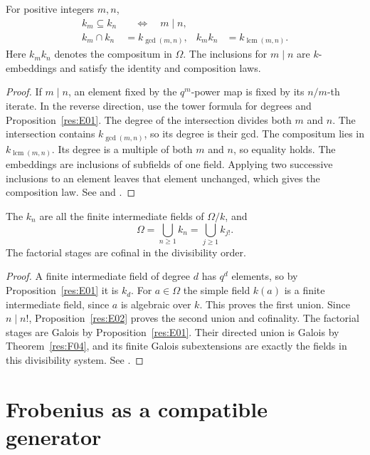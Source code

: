 \begin{proposition}\label{res:E02}
For positive integers \(m,n\),
\[
\begin{aligned}
   k_m\subseteq k_n &\quad\Longleftrightarrow\quad m\mid n,\\
   k_m\cap k_n &= k_{\gcd(m,n)},&
   k_m k_n &= k_{\operatorname{lcm}(m,n)} .
\end{aligned}
\]
Here \(k_m k_n\) denotes the compositum in \(\Omega\).
The inclusions for \(m\mid n\) are \(k\)-embeddings and satisfy
the identity and composition laws.
\end{proposition}
\begin{proof}
If \(m\mid n\), an element fixed by the \(q^m\)-power map is fixed by
its \(n/m\)-th iterate. In the reverse direction, use the tower formula
for degrees and Proposition~\ref{res:E01}.
The degree of the intersection divides both \(m\) and \(n\). The
intersection contains \(k_{\gcd(m,n)}\), so its degree is their gcd.
The compositum lies in \(k_{\operatorname{lcm}(m,n)}\). Its degree
is a multiple of both \(m\) and \(n\), so equality holds. The embeddings
are inclusions of subfields of one field. Applying two successive
inclusions to an element leaves that element unchanged, which gives
the composition law. See \cite[Corollary 4.21 and Proposition 4.23]{milne}
and \cite[Theorem 2.6]{ln}.
\end{proof}

\begin{corollary}\label{res:E03}
The \(k_n\) are all the finite intermediate fields of \(\Omega/k\),
and
\[
                \Omega=\bigcup_{n\geq1}k_n=\bigcup_{j\geq1} k_{j!}.
\]
The factorial stages are cofinal in the divisibility order.
\end{corollary}
\begin{proof}
A finite intermediate field of degree \(d\) has \(q^d\) elements, so
by Proposition~\ref{res:E01} it is \(k_d\). For \(a\in\Omega\) the
simple field \(k(a)\) is a finite intermediate field, since \(a\)
is algebraic over \(k\). This proves the first union.
Since \(n\mid n!\), Proposition~\ref{res:E02} proves the second union
and cofinality. The factorial stages are Galois by
Proposition~\ref{res:E01}. Their directed union is Galois by
Theorem~\ref{res:F04}, and its finite Galois subextensions are
exactly the fields in this divisibility system.
See \cite[Propositions 4.23--4.24]{milne}.
\end{proof}

\section{Frobenius as a compatible generator}

